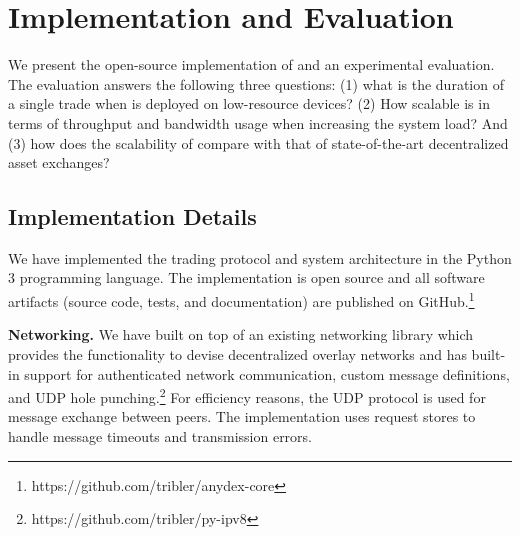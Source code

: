 \section{Implementation and Evaluation}
\label{sec:evaluation}
We present the open-source implementation of \ModelName{} and an experimental evaluation.
The evaluation answers the following three questions: (1) what is the duration of a single trade when \ModelName{} is deployed on low-resource devices? (2) How scalable is \ModelName{} in terms of throughput and bandwidth usage when increasing the system load? And (3) how does the scalability of \ModelName{} compare with that of state-of-the-art decentralized asset exchanges?

\subsection{Implementation Details}
\label{sec:implementation}
We have implemented the \ModelName{} trading protocol and system architecture in the Python 3 programming language.
The implementation is open source and all software artifacts (source code, tests, and documentation) are published on GitHub.\footnote{https://github.com/tribler/anydex-core}

\textbf{Networking.}
We have built \ModelName{} on top of an existing networking library
which provides the functionality to devise decentralized overlay networks and has built-in support for authenticated network communication, custom message definitions, and UDP hole punching.\footnote{https://github.com/tribler/py-ipv8}
For efficiency reasons, the UDP protocol is used for message exchange between peers.
The \ModelName{} implementation uses request stores to handle message timeouts and transmission errors.

